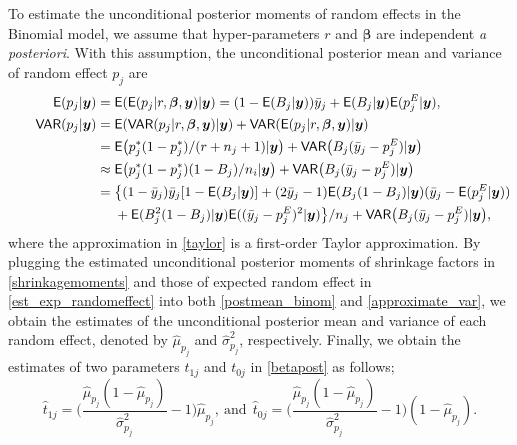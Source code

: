 \documentclass[article]{jss}
\begin{document}
To estimate the unconditional posterior moments of random effects in the Binomial model, we assume that hyper-parameters $r$  and  $\boldsymbol{\beta}$ are independent \emph{a posteriori}. With this assumption,  the unconditional posterior mean and variance of random effect $p_j$ are
\begin{align}
\mathsf{E}(p_{j}\vert \boldsymbol{y}) &=\mathsf{E}(\mathsf{E}(p_{j}\vert r, \boldsymbol{\beta}, \boldsymbol{y})\vert\boldsymbol{y})=(1-\mathsf{E}(B_j\vert\boldsymbol{y}))\bar{y}_j + \mathsf{E}(B_j\vert  \boldsymbol{y})\mathsf{E}(p^E_{j}\vert  \boldsymbol{y}),\label{postmean_binom} \\
~~~~~~\mathsf{VAR}(p_{j}\vert \boldsymbol{y}) &=  \mathsf{E}(\mathsf{VAR}(p_{j}\vert r, \boldsymbol{\beta}, \boldsymbol{y})\vert \boldsymbol{y})+\mathsf{VAR}(\mathsf{E}(p_{j}\vert r, \boldsymbol{\beta},\boldsymbol{y})\vert \boldsymbol{y})\label{postvar}\\
&= \mathsf{E}\big(p^{\ast}_{j}(1-p^{\ast}_{j})/ (r+n_{j}+1)\vert  \boldsymbol{y}\big)+\mathsf{VAR}\big(B_{j}(\bar{y}_{j}-p^E_{j})\vert \boldsymbol{y}\big) \\
&\approx \mathsf{E}\big(p^{\ast}_{j}(1-p^{\ast}_{j})(1-B_{j})/n_{i}\vert \boldsymbol{y}\big)+\mathsf{VAR}\big(B_{j}(\bar{y}_{j}-p^E_{j})\vert \boldsymbol{y}\big)\label{taylor}\\
&=\big\{(1-\bar{y}_j)\bar{y}_j[1-\mathsf{E}(B_j\vert \boldsymbol{y})]+(2\bar{y}_j-1)\mathsf{E}(B_j(1-B_j) \vert \boldsymbol{y})(\bar{y}_j-\mathsf{E}(p^E_j\vert\boldsymbol{y}))\nonumber\\
&~~~~+\mathsf{E}(B_j^2(1-B_j) \vert \boldsymbol{y})\mathsf{E}((\bar{y}_j-p^E_j)^2\vert\boldsymbol{y})\big\}/n_j+\mathsf{VAR}\big(B_{j}(\bar{y}_{j}-p^E_{j})\vert \boldsymbol{y}\big),\label{approximate_var}
\end{align}
where the approximation in \eqref{taylor} is a first-order Taylor approximation. By plugging the estimated unconditional posterior moments of shrinkage factors in \eqref{shrinkagemoments} and those of expected random effect in \eqref{est_exp_randomeffect} into  both \eqref{postmean_binom} and \eqref{approximate_var}, we obtain the estimates of the unconditional posterior mean and variance of each random effect, denoted by $\hat{\mu}_{p_j}$ and $\hat{\sigma}^2_{p_j}$, respectively. Finally, we obtain the estimates of two parameters $t_{1j}$ and $t_{0j}$ in  \eqref{betapost} as follows;
\begin{equation}\label{posttrueprob}
\hat{t}_{1j}=\bigg(\frac{\hat{\mu}_{p_j}(1-\hat{\mu}_{p_j})}{\hat{\sigma}^2_{p_j}}-1\bigg)\hat{\mu}_{p_j},~\textrm{and}~~\hat{t}_{0j}=\bigg(\frac{\hat{\mu}_{p_j}(1-\hat{\mu}_{p_j})}{\hat{\sigma}^2_{p_j}}-1\bigg)(1-\hat{\mu}_{p_j}).
\end{equation}
\end{document}
